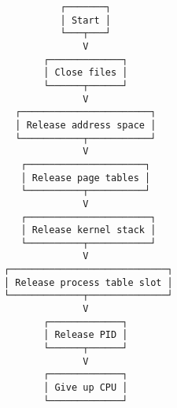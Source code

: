 \documentclass[varwidth,crop]{standalone}
\begin{document}
\begin{verbatim}
          ┌───────┐
          │ Start │
          └───┬───┘
              V
       ┌─────────────┐
       │ Close files │
       └──────┬──────┘
              V
  ┌───────────────────────┐
  │ Release address space │
  └───────────┬───────────┘
              V
   ┌─────────────────────┐
   │ Release page tables │
   └──────────┬──────────┘
              V
   ┌──────────────────────┐
   │ Release kernel stack │
   └──────────┬───────────┘
              V
┌────────────────────────────┐
│ Release process table slot │
└─────────────┬──────────────┘
              V
       ┌─────────────┐
       │ Release PID │
       └──────┬──────┘
              V
       ┌─────────────┐
       │ Give up CPU │
       └─────────────┘
\end{verbatim}
\end{document}
